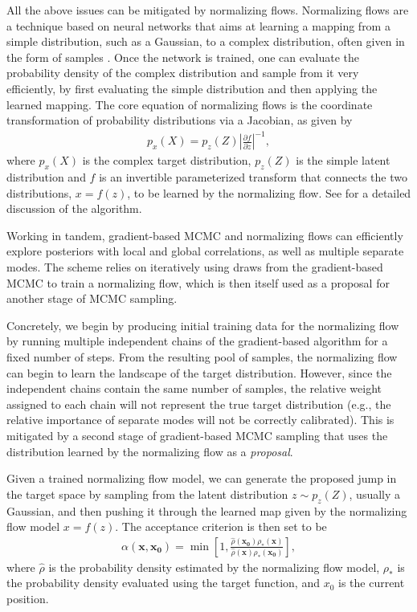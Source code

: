 \documentclass[twocolumn]{aastex631}
\begin{document}
All the above issues can be mitigated by normalizing flows.  Normalizing flows
are a technique based on neural networks that aims at learning a mapping from a
simple distribution, such as a Gaussian, to a complex distribution, often given
in the form of samples \cite{2019arXiv190809257K, 2019arXiv191202762P}. Once
the network is trained, one can evaluate the probability density of the complex
distribution and sample from it very efficiently, by first evaluating the
simple distribution and then applying the learned mapping. The core equation
of normalizing flows is the coordinate transformation of probability
distributions via a Jacobian, as given by
\begin{align}
    p_x(X) = p_z(Z) \left| \frac{\partial f}{\partial z}\right|^{-1},
\end{align}
where $p_x(X)$ is the complex target distribution, $p_z(Z)$ is the simple
latent distribution and $f$ is an invertible parameterized transform that
connects the two distributions, $x = f(z)$, to be learned by the normalizing
flow. See \cite{2019arXiv190809257K, 2019arXiv191202762P} for a detailed
discussion of the algorithm.

Working in tandem, gradient-based MCMC and normalizing flows can efficiently
explore posteriors with local and global correlations, as well as multiple
separate modes.  The scheme relies on iteratively using draws from the
gradient-based MCMC to train a normalizing flow, which is then itself used as a
proposal for another stage of MCMC sampling.

Concretely, we begin by producing initial training data for the normalizing
flow by running multiple independent chains of the gradient-based algorithm for
a fixed number of steps.  From the resulting pool of samples, the normalizing
flow can begin to learn the landscape of the target distribution.
However, since the independent chains contain the same number of samples, the
relative weight assigned to each chain will not represent the true target
distribution (e.g., the relative importance of separate modes will not be
correctly calibrated). This is mitigated by a second stage of gradient-based
MCMC sampling that uses the distribution learned by the normalizing flow as a
\textit{proposal}.

Given a trained normalizing flow model, we can generate the proposed jump in
the target space by sampling from the latent distribution $z \sim p_z(Z)$,
usually a Gaussian, and then pushing it through the learned map given by the
normalizing flow model $x=f(z)$.  The acceptance criterion is then set to be
\begin{align} \label{eq:flow-proposal}
    \alpha(\mathbf{x},\mathbf{x_0}) = \min \left[ 1, \frac{\hat{\rho}(\mathbf{x_0})\rho_*(\mathbf{x})}{\hat{\rho}(\mathbf{x})\rho_*(\mathbf{x_0})}\right],
\end{align}
where $\hat{\rho}$ is the probability density estimated by the normalizing flow
model, $\rho_*$ is the probability density evaluated using the target function,
and $x_0$ is the current position.
\end{document}
